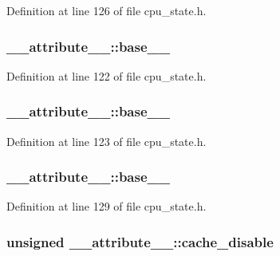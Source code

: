 \-Definition at line 126 of file cpu\-\_\-state.\-h.

\hypertarget{struct____attribute_____a47f1e95768e2624cabdc87ffa1ce5ea0}{
\subsubsection[{base\-\_\-0\-\_\-15}]{ {\bf \-\_\-\-\_\-attribute\-\_\-\-\_\-\-::base\-\_\-\_}}}\label{struct____attribute_____a47f1e95768e2624cabdc87ffa1ce5ea0}


\-Definition at line 122 of file cpu\-\_\-state.\-h.

\hypertarget{struct____attribute_____afc7ce2a59b5efc28a2518611347f47ba}{
\subsubsection[{base\-\_\-16\-\_\-23}]{ {\bf \-\_\-\-\_\-attribute\-\_\-\-\_\-\-::base\-\_\-\_}}}\label{struct____attribute_____afc7ce2a59b5efc28a2518611347f47ba}


\-Definition at line 123 of file cpu\-\_\-state.\-h.

\hypertarget{struct____attribute_____aaf4a04d69879a3c26dc4ba58bf3c975b}{
\subsubsection[{base\-\_\-24\-\_\-31}]{ {\bf \-\_\-\-\_\-attribute\-\_\-\-\_\-\-::base\-\_\-\_}}}\label{struct____attribute_____aaf4a04d69879a3c26dc4ba58bf3c975b}


\-Definition at line 129 of file cpu\-\_\-state.\-h.

\hypertarget{struct____attribute_____a6f6be37e97343c365cecf5bbafe89119}{
\subsubsection[{cache\-\_\-disable}]{\setlength{\rightskip}{0pt plus 5cm}unsigned {\bf \-\_\-\-\_\-attribute\-\_\-\-\_\-\-::cache\-\_\-disable}}}\label{struct____attribute_____a6f6be37e97343c365cecf5bbafe89119}


